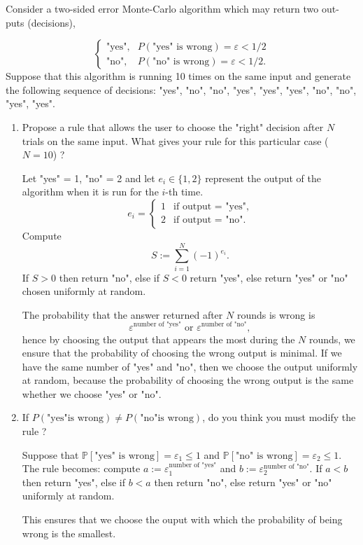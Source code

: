 \documentclass[fontsize=12pt, usenames, dvipsnames, headinclude, headsepline, footinclude, footsepline]{scrartcl}
\renewcommand{\P}{\mathbb{P}}
\renewcommand{\epsilon}{\varepsilon}
\begin{document}
\begin{exo}
  Consider a two-sided error Monte-Carlo algorithm which may return two out- puts (decisions), 
  
  \[
    \begin{cases}
      \text{"yes"},& P(\text{"yes" is wrong}) = \epsilon < 1/2 \\
      \text{"no"},& P(\text{"no" is wrong}) = \epsilon < 1/2.
    \end{cases}
  \] 
  Suppose that this algorithm is running 10 times on the same input and generate the following sequence of
  decisions: "yes", "no", "no", "yes", "yes", "yes", "no", "no", "yes", "yes".  
  \begin{enumerate}
  \item Propose a rule that allows the user to choose the "right" decision after $N$ trials on the same
    input. What gives your rule for this particular case ($N = 10$) ? 

    \begin{sol}
      Let "yes" = 1, "no" = 2 and let $e_i \in \{1, 2\}$ represent the output of the algorithm when it is run
      for the $i$-th time. 
      \[e_i  =
        \begin{cases}
          1 & \text{if output = "yes"},\\
          2 & \text{if output = "no"}.
        \end{cases}
      \]
      Compute 
      \[ S := \sum_{i=1}^{N}(-1)^{e_i}. \]
      If $S > 0$ then return "no", else if $S < 0$ return "yes", else return "yes" or "no" chosen uniformly at
      random. 

      The probability that the answer returned after $N$ rounds is wrong is 
      \[ \epsilon^{\text{number of "yes"}} \text{ or } \epsilon^{\text{number of "no"}}, \]
      hence by choosing the output that appears the most during the $N$ rounds, we ensure that the probability
      of choosing the wrong output is minimal. If we have the same number of "yes" and "no", then we choose
      the output uniformly at random, because the probability of choosing the wrong output is the same whether
      we choose "yes" or "no".
    \end{sol}

  \item If $P(\text{"yes"is wrong}) \neq  P(\text{"no"is wrong})$, do you think you must modify the rule ?

    \begin{sol}
      Suppose that $\P[\text{"yes" is wrong}] = \epsilon_1 \leq 1$ and
      $\P[\text{"no" is wrong}] = \epsilon_2 \leq 1$. The rule becomes: compute
      $a := \epsilon_1^{\text{number of "yes"}}$ and $b := \epsilon_2^{\text{number of "no"}}$. If $a < b$
      then return "yes", else if $b < a$ then return "no", else return "yes" or "no" uniformly at random.
      
      This ensures that we choose the ouput with which the probability of being wrong is the smallest.
    \end{sol}
  \end{enumerate}

\end{exo}
\end{document}
